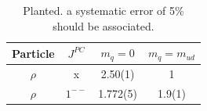 \begin{table}
\begin{tabular}{|c|c|c|c|}
\hline Particle &$J^{PC}$&$m_q = 0$ & $m_q=m_{ud}$ \\
\hline $\rho$ & x & 2.50(1) & 1 \\
\hline $\rho$ & $1^{--}$ & 1.772(5) & 1.9(1) \\
\end{tabular}
\caption{Planted. a systematic error
of 5\% should be associated.}\label{tab:largeNsummary}
\end{table}
